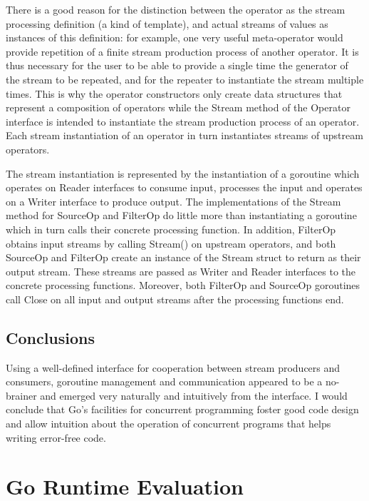 \documentclass {article}
\begin{document}
There is a good reason for the distinction between the operator as the stream
processing definition (a kind of template), and actual streams of values as
instances of this definition: for example, one very useful meta-operator would
provide repetition of a finite stream production process of another operator. It
is thus necessary for the user to be able to provide a single time the generator
of the stream to be repeated, and for the repeater to instantiate the stream
multiple times. This is why the operator constructors only create data
structures that represent a composition of operators while the Stream method of
the Operator interface is intended to instantiate the stream production process
of an operator. Each stream instantiation of an operator in turn instantiates
streams of upstream operators.

The stream instantiation is represented by the instantiation of a goroutine
which operates on Reader interfaces to consume input, processes the input and
operates on a Writer interface to produce output. The implementations of the
Stream method for SourceOp and FilterOp do little more than instantiating a
goroutine which in turn calls their concrete processing function. In addition,
FilterOp obtains input streams by calling Stream() on upstream operators, and
both SourceOp and FilterOp create an instance of the Stream struct to return as
their output stream. These streams are passed as Writer and Reader interfaces to
the concrete processing functions. Moreover, both FilterOp and SourceOp
goroutines call Close on all input and output streams after the processing
functions end.

\subsection{Conclusions}

Using a well-defined interface for cooperation between stream producers and
consumers, goroutine management and communication appeared to be a no-brainer
and emerged very naturally and intuitively from the interface. I would conclude
that Go's facilities for concurrent programming foster good code design and
allow intuition about the operation of concurrent programs that helps writing
error-free code.

\section{Go Runtime Evaluation}
\label{sec:runtime}
\end{document}
